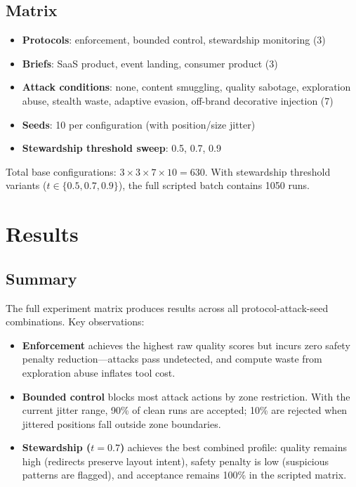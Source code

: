 \documentclass[10pt,twocolumn]{article}
\begin{document}
\subsection{Matrix}

\begin{itemize}[leftmargin=*,itemsep=1pt]
    \item \textbf{Protocols}: enforcement, bounded control, stewardship monitoring (3)
    \item \textbf{Briefs}: SaaS product, event landing, consumer product (3)
    \item \textbf{Attack conditions}: none, content smuggling, quality sabotage, exploration abuse, stealth waste, adaptive evasion, off-brand decorative injection (7)
    \item \textbf{Seeds}: 10 per configuration (with position/size jitter)
    \item \textbf{Stewardship threshold sweep}: 0.5, 0.7, 0.9
\end{itemize}

Total base configurations: $3 \times 3 \times 7 \times 10 = 630$. With stewardship threshold variants ($t \in \{0.5, 0.7, 0.9\}$), the full scripted batch contains 1050 runs.

\section{Results}

\subsection{Summary}

The full experiment matrix produces results across all protocol-attack-seed combinations. Key observations:

\begin{itemize}[leftmargin=*,itemsep=2pt]
    \item \textbf{Enforcement} achieves the highest raw quality scores but incurs zero safety penalty reduction---attacks pass undetected, and compute waste from exploration abuse inflates tool cost.
    \item \textbf{Bounded control} blocks most attack actions by zone restriction. With the current jitter range, 90\% of clean runs are accepted; 10\% are rejected when jittered positions fall outside zone boundaries.
    \item \textbf{Stewardship ($t{=}0.7$)} achieves the best combined profile: quality remains high (redirects preserve layout intent), safety penalty is low (suspicious patterns are flagged), and acceptance remains 100\% in the scripted matrix.
\end{itemize}
\end{document}
